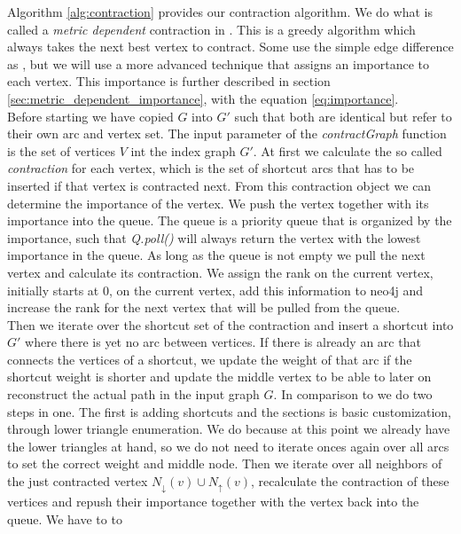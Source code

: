 Algorithm \ref{alg:contraction} provides our contraction algorithm. We do what is called a \textit{metric dependent} contraction in \cite[Customization Contraction Hierarchies]{CCH}. 
This is a greedy algorithm which always takes the next best vertex to contract. Some use the simple edge difference as \cite[Contraction Hierarchies]{Geisberger_2012}, but we will use
a more advanced technique that assigns an importance to each vertex. This importance is further described in section \ref{sec:metric_dependent_importance}, with the equation \ref{eq:importance}.
\\
Before starting we have copied $G$ into $G'$ such that both are identical but refer to their own arc and vertex set. The input parameter of the \textit{contractGraph} function is the set of vertices $V$ int the index graph $G'$.
At first we calculate the so called \textit{contraction} for each vertex, which is the set of shortcut arcs that has to be inserted if that vertex is contracted next. From this contraction object we 
can determine the importance of the vertex. We push the vertex together with its importance into the queue. The  queue is a priority queue that is organized by the importance, such that \textit{Q.poll()} will always return the vertex with the 
lowest importance in the queue. As long as the queue is not empty we pull the next vertex and calculate its contraction. We assign the rank on the current vertex, initially starts at 0, on the current vertex, add this information to neo4j and increase 
the rank for the next vertex that will be pulled from the queue. 
\\ 
Then we iterate over the shortcut set of the contraction and insert a shortcut into $G'$ where there is yet no arc between vertices. If there is already an arc that connects the vertices of a shortcut, we update the weight of that arc if the shortcut
weight is shorter and update the middle vertex to be able to later on reconstruct the actual path in the input graph $G$.
In comparison to \cite[Customization Contraction Hierarchies]{CCH}  we do two steps in one. The first is adding shortcuts and the sections is basic customization, through lower triangle enumeration. We do because at this point we already have 
the lower triangles at hand, so we do not need to iterate onces again over all arcs to set the correct weight and middle node. 
Then we iterate over all neighbors of the just contracted vertex $N_\downarrow(v) \cup N_\uparrow(v)$, recalculate the contraction of these vertices and repush their importance together with the vertex back into the queue. We have to to 
